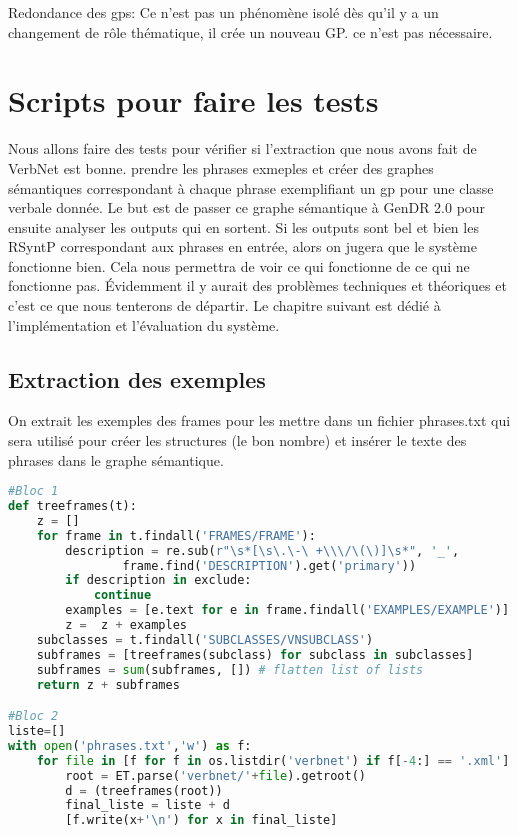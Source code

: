 Redondance des gps: Ce n'est pas un phénomène isolé dès qu'il y a un changement de rôle thématique, il crée un nouveau GP. ce n'est pas nécessaire.


\section{Scripts pour faire les tests}

Nous allons faire des tests pour vérifier si l'extraction que nous avons fait de VerbNet est bonne. prendre les phrases exmeples et créer des graphes sémantiques correspondant à chaque phrase exemplifiant un gp pour une classe verbale donnée. Le but est de passer ce graphe sémantique à GenDR 2.0 pour ensuite analyser les outputs qui en sortent. Si les outputs sont bel et bien les RSyntP correspondant aux phrases en entrée, alors on jugera que le système fonctionne bien. Cela nous permettra de voir ce qui fonctionne de ce qui ne fonctionne pas. Évidemment il y aurait des problèmes techniques et théoriques et c'est ce que nous tenterons de départir. Le chapitre suivant est dédié à l'implémentation et l'évaluation du système.

\subsection{Extraction des exemples}

On extrait les exemples des frames pour les mettre dans un fichier phrases.txt qui sera utilisé pour créer les structures (le bon nombre) et insérer le texte des phrases dans le graphe sémantique.

\begin{lstlisting}[language=Python, caption = code pour créer phrases.txt]
#Bloc 1
def treeframes(t):
    z = []
    for frame in t.findall('FRAMES/FRAME'):
        description = re.sub(r"\s*[\s\.\-\ +\\\/\(\)]\s*", '_',
				frame.find('DESCRIPTION').get('primary'))
        if description in exclude:
            continue    
        examples = [e.text for e in frame.findall('EXAMPLES/EXAMPLE')]
        z =  z + examples 
    subclasses = t.findall('SUBCLASSES/VNSUBCLASS')
    subframes = [treeframes(subclass) for subclass in subclasses]
    subframes = sum(subframes, []) # flatten list of lists
    return z + subframes

#Bloc 2
liste=[]
with open('phrases.txt','w') as f:
    for file in [f for f in os.listdir('verbnet') if f[-4:] == '.xml']:
        root = ET.parse('verbnet/'+file).getroot()       
        d = (treeframes(root))
        final_liste = liste + d
        [f.write(x+'\n') for x in final_liste]

\end{lstlisting}

